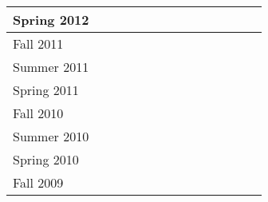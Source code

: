 \documentclass[11pt]{letter}
\newcommand{\ck}{\checkmark}
\newcommand{\comment}[1]{}
\begin{document}
\begin{tabular}{|l|c|c|c|c|c|c|c|c|c|c|c|c|c|}
  Spring 2012 &\ck &    &    &    &    &\ck &\ck &    &    &    &    &    &    \\ \hline
  Fall   2011 &\ck &    &    &    &    &    &    &    &    &    &    &\ck &    \\ \hline
  Summer 2011 &    &    &    &    &    &\ck &    &    &    &    &    &    &    \\ \hline
  Spring 2011 &\ck &    &    &\ck &    &\ck &    &    &    &    &    &    &    \\ \hline
  Fall   2010 &\ck &    &    &    &    &    &    &    &    &    &    &    &    \\ \hline
  Summer 2010 &    &    &    &    &    &\ck &    &    &    &    &    &    &    \\ \hline
  Spring 2010 &\ck &    &    &\ck &    &\ck &    &    &    &    &    &    &    \\ \hline
  Fall   2009 &\ck &    &    &    &    &\ck &    &    &    &    &    &    &    \\ \hline
\end{tabular}

\comment{
\begin{enumerate}
\item CPSC 120 Introduction to Programming: Fall 2019, Fall 2018, Fall 2012,  Spring 2012, Fall 2011, Spring 2011, Fall 2010, Spring 2010, Fall 2009
\item CPSC 131 Data Structures Concepts: Fall 2016, Spring 2016, Fall 2015, Spring 2013, Fall 2013
\item CPSC 223C C Programming: Spring 2015
\item CPSC 254 Unix and Open Source Software: Spring 2011, Spring 2010
\item CPSC 305 Coding for Artists: Fall 2018, Fall 2017
\item CPSC 335 Algorithm Engineering: Summer 2019, Spring 2019, Fall 2018, Summer 2018, Spring 2018, Fall 2017, Summer 2015, Spring 2015, Fall 2014, Summer 2014, Spring 2014, Summer 2013, Spring 2013, Summer 2012, Spring 2012, Summer 2011, Spring 2011, Summer 2010, Spring 2010, Fall 2009
\item CPSC 433 Data Security and Encryption: Summer 2012
\item CPSC 439 Theory of Computation: Fall 2016, Fall 2015, Fall 2014, Spring 2012
\item CPSC 452 Cryptography: Summer 2017, Summer 2012
\item CPSC 481 Artificial Intelligence: Fall 2013
\item CPSC 484 Principles of Computer Graphics: Spring 2019, Spring 2018, Spring 2016
\item CPSC 535 Advanced Algorithms: Fall 2019, Spring 2019
\item CPSC 597 Graduate Project: Fall 2011
\end{enumerate}
}
\end{document}

